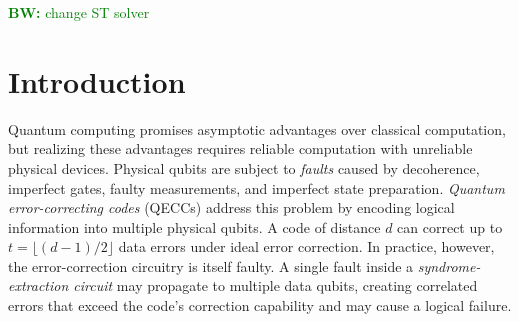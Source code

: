 \documentclass[acmsmall,screen,review,anonymous,nonacm]{acmart}
\newcommand{\showcomment}[1]{#1}
\newcommand{\bw}[1]{\showcomment{\textcolor{green}{\textbf{BW:} #1}}}
\begin{document}
\maketitle

\bw{change ST solver}
\section{Introduction}


Quantum computing promises asymptotic advantages over classical computation, but realizing these advantages requires reliable computation with unreliable physical devices. Physical qubits are subject to \emph{faults} caused by decoherence, imperfect gates, faulty measurements, and imperfect state preparation. \emph{Quantum error-correcting codes} (QECCs) address this problem by encoding logical information into multiple physical qubits. A code of distance $d$ can correct up to $t=\lfloor(d-1)/2\rfloor$ data errors under ideal error correction. In practice, however, the error-correction circuitry is itself faulty. A single fault inside a \emph{syndrome-extraction circuit} may propagate to multiple data qubits, creating correlated errors that exceed the code's correction capability and may cause a logical failure.

\end{document}
